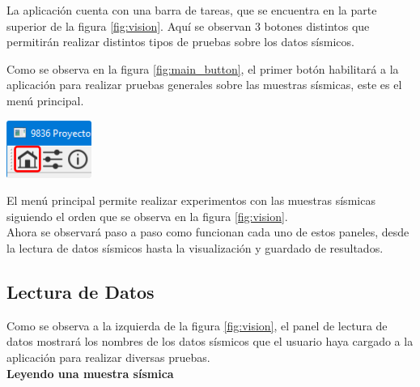 \documentclass[12pt,oneside,a4]{article}
\newcommand*\circled[1]{\tikz[baseline=(char.base)]{
            \node[shape=circle,draw,inner sep=2pt] (char) {#1};}}
\newenvironment{Figure}
  {\par\medskip\noindent\minipage{\linewidth}}
  {\endminipage\par\medskip}
\begin{document}
La aplicación cuenta con una barra de tareas, que se encuentra en la parte superior \circled{1} de la figura \ref{fig:vision}. Aquí se observan 3 botones distintos que permitirán realizar distintos tipos de pruebas sobre los datos sísmicos.


\begin{multicols}{2}

Como se observa en la figura \ref{fig:main_button}, el primer botón habilitará a la aplicación para realizar pruebas generales sobre las muestras sísmicas, este es el menú principal.

\begin{Figure}
    \centering
    \includegraphics[width=0.3\linewidth]{main-tab.png}
    \label{fig:main_button}
\end{Figure}

\end{multicols}

El menú principal permite realizar experimentos con las muestras sísmicas siguiendo el orden que se observa en la figura \ref{fig:vision}. \\

Ahora se observará paso a paso como funcionan cada uno de estos paneles, desde la lectura de datos sísmicos hasta la visualización y guardado de resultados.


\subsection{Lectura de Datos}

Como se observa a la izquierda \circled{2} de la figura \ref{fig:vision}, el panel de lectura de datos mostrará los nombres de los datos sísmicos que el usuario haya cargado a la aplicación para realizar diversas pruebas.\\

\textbf{Leyendo una muestra sísmica} \label{sec:data_lecture}
\end{document}
